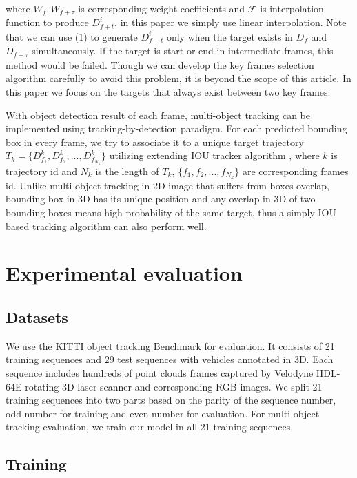 \documentclass{bmvc2k}
\begin{document}
where $W_f, W_{f+\tau}$ is corresponding weight coefficients and $\mathcal{F}$ is interpolation function to produce $D^i_{f+t}$, in this paper we simply use linear interpolation. Note that we can use (1) to generate $D^i_{f+t}$ only when the target exists in $D_f$ and $D_{f+\tau}$ simultaneously. If the target is start or end in intermediate frames, this method would be failed. Though we can develop the key frames selection algorithm carefully to avoid this problem, it is beyond the scope of this article. In this paper we focus on the targets that always exist between two key frames.

With object detection result of each frame, multi-object tracking can be implemented using tracking-by-detection paradigm. For each predicted bounding box in every frame, we try to associate it to a unique target trajectory $T_k = \{D^k_{f_1}, D^k_{f_2}, ..., D^k_{f_{N_k}}\}$ utilizing extending IOU tracker algorithm \cite{bochinski2018extending}, where $k$ is trajectory id and $N_k$ is the length of $T_k$, $\{f_1, f_2, ..., f_{N_k}\}$ are corresponding frames id. Unlike multi-object tracking in 2D image that suffers from boxes overlap, bounding box in 3D has its unique position and any overlap in 3D of two bounding boxes means high probability of the same target, thus a simply IOU based tracking algorithm can also perform well.

\section{Experimental evaluation}
\label{sec:experiments}

\subsection{Datasets}
We use the KITTI object tracking Benchmark \cite{geiger2013vision} for evaluation. It consists of 21 training sequences and 29 test sequences with vehicles annotated in 3D. Each sequence includes hundreds of point clouds frames captured by Velodyne HDL-64E rotating 3D laser scanner and corresponding RGB images. We split 21 training sequences into two parts based on the parity of the sequence number, odd number for training and even number for evaluation. For multi-object tracking evaluation, we train our model in all 21 training sequences.

\subsection{Training}
\end{document}
